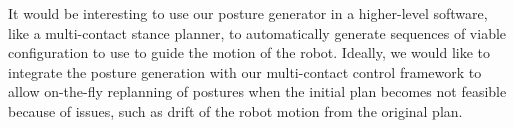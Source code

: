 
It would be interesting to use our posture generator in a higher-level software, like a multi-contact stance planner, to automatically generate sequences of viable configuration to use to guide the motion of the robot.
Ideally, we would like to integrate the posture generation with our multi-contact control framework to allow on-the-fly replanning of postures when the initial plan becomes not feasible because of issues, such as drift of the robot motion from the original plan.




